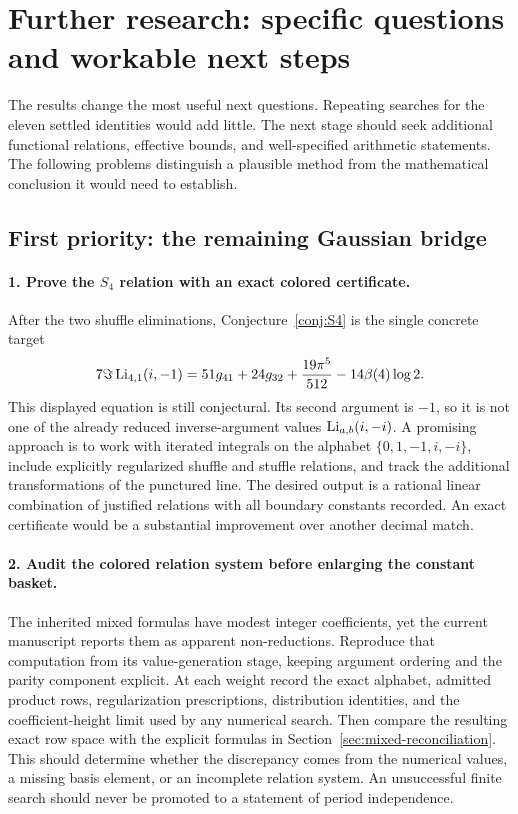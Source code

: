 \section{Further research: specific questions and workable next steps}
\label{sec:research}

The results change the most useful next questions. Repeating searches
for the eleven settled identities would add little. The next stage
should seek additional functional relations, effective bounds, and
well-specified arithmetic statements. The following problems distinguish
a plausible method from the mathematical conclusion it would need
to establish.

\subsection{First priority: the remaining Gaussian bridge}

\paragraph{1. Prove the \(S_4\) relation with an exact colored certificate.}
After the two shuffle eliminations, Conjecture~\ref{conj:S4} is the
single concrete target
\[
7\Im\operatorname{Li}_{4,1}(i,-1)
=51g_{41}+24g_{32}+\frac{19\pi^5}{512}
-14\beta(4)\log2.
\]
This displayed equation is still conjectural. Its second argument
is \(-1\), so it is not one of the already reduced inverse-argument
values \(\operatorname{Li}_{a,b}(i,-i)\).
A promising approach is to work with iterated integrals on the alphabet
\(\{0,1,-1,i,-i\}\), include explicitly regularized shuffle and stuffle
relations, and track the additional transformations of the punctured
line. The desired output is a rational linear combination of justified
relations with all boundary constants recorded.
An exact certificate would be a substantial improvement over another
decimal match.

\paragraph{2. Audit the colored relation system before enlarging the
constant basket.}
The inherited mixed formulas have modest integer coefficients, yet the
current manuscript reports them as apparent non-reductions.
Reproduce that computation from its value-generation stage, keeping
argument ordering and the parity component explicit.
At each weight record the exact alphabet, admitted product rows,
regularization prescriptions, distribution identities, and the
coefficient-height limit used by any numerical search.
Then compare the resulting exact row space with the explicit formulas
in Section~\ref{sec:mixed-reconciliation}.
This should determine whether the discrepancy comes from the numerical
values, a missing basis element, or an incomplete relation system.
An unsuccessful finite search should never be promoted to a statement
of period independence.

